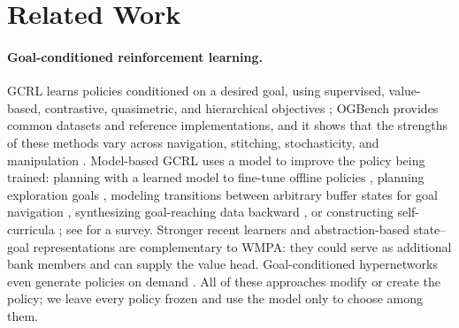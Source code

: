 \documentclass{article}
\theoremstyle{plain}
\theoremstyle{definition}
\theoremstyle{plain}
\newcommand{\wmpa}{\textsc{WMPA}}
\begin{document}
\section{Related Work}
\label{sec:related}
\paragraph{Goal-conditioned reinforcement learning.}
GCRL learns policies conditioned on a desired goal, using supervised, value-based, contrastive, quasimetric, and hierarchical objectives \citep{eysenbach2022contrastive,wang2023quasimetric,park2023hiql}; OGBench provides common datasets and reference implementations, and it shows that the strengths of these methods vary across navigation, stitching, stochasticity, and manipulation \citep{park2025ogbench}. Model-based GCRL uses a model to improve the policy being trained: planning with a learned model to fine-tune offline policies \citep[GOPlan;][]{wang2024goplan}, planning exploration goals \citep[PEG;][]{hu2023peg}, modeling transitions between arbitrary buffer states for goal navigation \citep{duan2024mun}, synthesizing goal-reaching data backward \citep{hoftmann2023backward}, or constructing self-curricula \citep{gong2024gcpo}; see \citet{liu2022gcrl} for a survey. Stronger recent learners \citep{dong2026hiflowq} and abstraction-based state--goal representations \citep{wibault2026abstraction} are 
complementary to \wmpa{}: they could serve as additional bank members and can supply the value head. Goal-conditioned hypernetworks even generate policies on demand \citep{faccio2023goalcond}. All of these approaches modify or create the policy; we leave every policy frozen and use the model only to choose among them.
\end{document}
